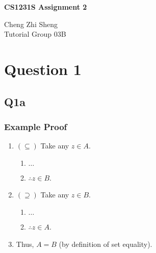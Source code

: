 \documentclass[12pt]{article}
\begin{document}
\begin{center}
    \huge
    \textbf{CS1231S Assignment 2}

    \vspace{0.5cm}
    Cheng Zhi Sheng \\
       
    \vspace{0.5cm}
    Tutorial Group 03B\\

    \vspace{0.5cm}
\end{center}

    
\section*{Question 1}
\subsection*{Q1a}
\subsubsection*{Example Proof}
\begin{enumerate}
    \item $(\subseteq)$ Take any $z \in A$.
    \begin{enumerate}
        \item $\dots$
        \item $\therefore z \in B$.
    \end{enumerate}

    \item $(\supseteq)$ Take any $z \in B$.
    \begin{enumerate}
        \item $\dots$
        \item $\therefore z \in A$.
    \end{enumerate}

    \item Thus, $A=B$ (by definition of set equality).
\end{enumerate}
\end{document}
